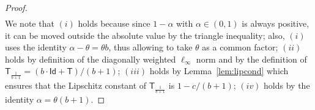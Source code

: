 \documentclass[journal,twoside,web]{ieeecolor}
\newcommand{\virg}[1]{``#1''}
\newcommand{\norm}[1]{{\left\vert\kern-0.25ex\left\vert #1\right\vert\kern-0.25ex\right\vert}}
\newcommand{\rea }{\mathbb{R}}
\newcommand{\xb}{\boldsymbol{x}}
\newcommand{\etab}{\boldsymbol{\eta}}
\newcommand{\Ts}{\mathsf{T}}
\newcommand{\Is}{\mathsf{Id}}
\begin{document}
\begin{proof}
\begin{align*}
    \end{align*}
    \endgroup
    We note that $(i)$ holds because since $1-\alpha$ with $\alpha\in(0,1)$ is always positive, it can be moved outside the absolute value by the triangle inequality; also, $(i)$ uses the identity ${\alpha-\theta=\theta b}$, thus allowing to take $\theta$ as a common factor; $(ii)$ holds by definition of the diagonally weighted $\ell_{\infty}$ norm and by the definition of ${\Ts_{\frac{1}{b+1}} = (b\cdot \Is +\Ts)/(b+1)}$; $(iii)$ holds by Lemma~\ref{lem:lipcond} which ensures that the Lipschitz constant of $\Ts_{\frac{1}{b+1}}$ is $1-c/(b+1)$; $(iv)$ holds by the identity ${\alpha= \theta(b+1)}$. %
\end{proof}

%


\end{document}

